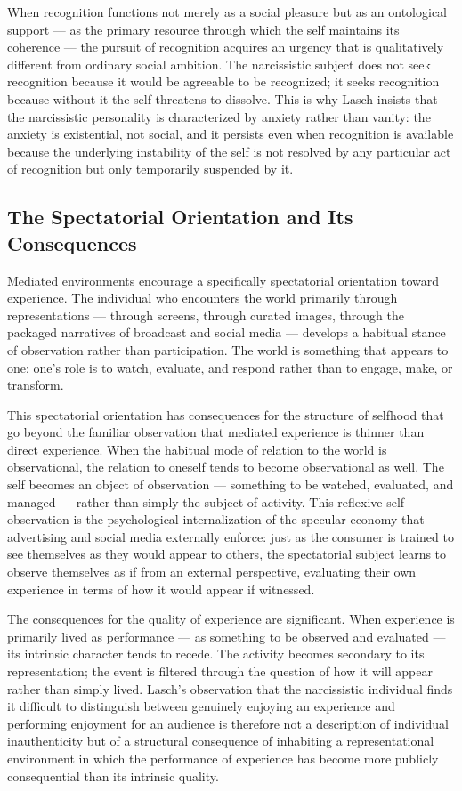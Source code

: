 \documentclass[12pt]{memoir}
\begin{document}
When recognition functions not merely as a social pleasure but as an ontological
support — as the primary resource through which the self maintains its coherence —
the pursuit of recognition acquires an urgency that is qualitatively different from
ordinary social ambition. The narcissistic subject does not seek recognition because
it would be agreeable to be recognized; it seeks recognition because without it the
self threatens to dissolve. This is why Lasch insists that the narcissistic personality
is characterized by anxiety rather than vanity: the anxiety is existential, not social,
and it persists even when recognition is available because the underlying instability
of the self is not resolved by any particular act of recognition but only temporarily
suspended by it.

\subsection{The Spectatorial Orientation and Its Consequences}

Mediated environments encourage a specifically spectatorial orientation toward
experience. The individual who encounters the world primarily through representations
— through screens, through curated images, through the packaged narratives of broadcast
and social media — develops a habitual stance of observation rather than participation.
The world is something that appears to one; one's role is to watch, evaluate, and
respond rather than to engage, make, or transform.

This spectatorial orientation has consequences for the structure of selfhood that go
beyond the familiar observation that mediated experience is thinner than direct
experience. When the habitual mode of relation to the world is observational, the
relation to oneself tends to become observational as well. The self becomes an object
of observation — something to be watched, evaluated, and managed — rather than simply
the subject of activity. This reflexive self-observation is the psychological
internalization of the specular economy that advertising and social media externally
enforce: just as the consumer is trained to see themselves as they would appear to
others, the spectatorial subject learns to observe themselves as if from an external
perspective, evaluating their own experience in terms of how it would appear if
witnessed.

The consequences for the quality of experience are significant. When experience is
primarily lived as performance — as something to be observed and evaluated — its
intrinsic character tends to recede. The activity becomes secondary to its
representation; the event is filtered through the question of how it will appear
rather than simply lived. Lasch's observation that the narcissistic individual finds
it difficult to distinguish between genuinely enjoying an experience and performing
enjoyment for an audience is therefore not a description of individual inauthenticity
but of a structural consequence of inhabiting a representational environment in which
the performance of experience has become more publicly consequential than its intrinsic
quality.
\end{document}
